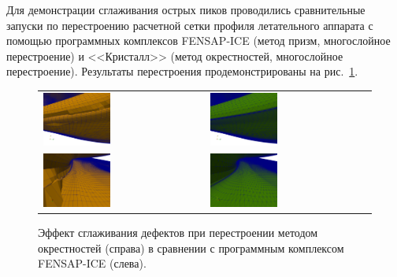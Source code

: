 Для демонстрации сглаживания острых пиков проводились сравнительные запуски по перестроению расчетной сетки профиля летательного аппарата с помощью программных комплексов FENSAP-ICE (метод призм, многослойное перестроение) и <<Кристалл>> (метод окрестностей, многослойное перестроение).
Результаты перестроения продемонстрированы на рис.~\ref{fig:text_1_remesh3_with_fensap}.

\begin{figure}[!ht]
\centering
\begin{tabular}{ll}
\includegraphics[width=0.43\textwidth]{pics/text_1_remesh_3d/fens1.png}
&
\includegraphics[width=0.43\textwidth]{pics/text_1_remesh_3d/crys1.png} \\
\includegraphics[width=0.43\textwidth]{pics/text_1_remesh_3d/fens2.png}
&
\includegraphics[width=0.43\textwidth]{pics/text_1_remesh_3d/crys2.png}
\end{tabular}
\singlespacing
\caption{Эффект сглаживания дефектов при перестроении методом окрестностей (справа) в сравнении с программным комплексом FENSAP-ICE (слева).}
\label{fig:text_1_remesh3_with_fensap}
\end{figure}

